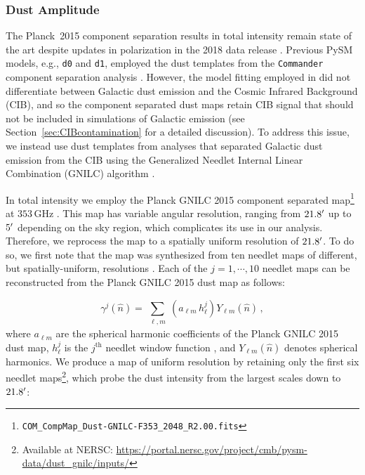 \documentclass[twocolumn]{aastex631}
\begin{document}
\subsubsection{Dust Amplitude}\label{sec:dustamplitude}
The Planck~2015 component separation results in total intensity remain state of the art despite updates in polarization in the 2018 data release \citep{planck2016-l04}. Previous PySM models, e.g., \texttt{d0} and \texttt{d1}, employed the dust templates from the \texttt{Commander} component separation analysis \citep{planck2014-a11}. However, the model fitting employed in \citet{planck2014-a11} did not differentiate between Galactic dust emission and the Cosmic Infrared Background (CIB), and so the component separated dust maps retain CIB signal that should not be included in simulations of Galactic emission (see Section~\ref{sec:CIBcontamination} for a detailed discussion). To address this issue, we instead use dust templates from analyses that separated Galactic dust emission from the CIB using the Generalized Needlet Internal Linear Combination (GNILC) algorithm \citep{Remazeilles:2011}. 

In total intensity we employ the Planck GNILC 2015 component separated map\footnote{\texttt{COM\_CompMap\_Dust-GNILC-F353\_2048\_R2.00.fits}} at $353$\,GHz \citep{planck2016-XLVIII}. This map has variable angular resolution, ranging from $21.8\mbox{$^\prime$}$ up to $5\mbox{$^\prime$}$ depending on the sky region, which complicates its use in our analysis. Therefore, we reprocess the map to a spatially uniform resolution of $21.8\mbox{$^\prime$}$. To do so, we first note that the map was synthesized from ten needlet maps of different, but spatially-uniform, resolutions \citep[][Figure~A.2]{planck2016-l04}. Each of the $j=1,\cdots,10$ needlet maps can be reconstructed from the Planck GNILC 2015 dust map as follows:

\begin{equation}
\gamma^{j}(\hat{n})
=\sum_{\substack{\ell,m}} \left(a_{\ell m}\, h^{j}_\ell\right)Y_{\ell m}(\hat{n})\,,
\label{eq:needlets_maps}
\end{equation}
where $a_{\ell m}$ are the spherical harmonic coefficients of the Planck GNILC 2015 dust map,  $h^{j}_\ell$ is the $j^\text{th}$ needlet window function \citep[see][Figure~A.2]{planck2016-l04}, and $Y_{\ell m}(\hat{n})$ denotes spherical harmonics. We produce a map of uniform resolution by retaining only the first six needlet maps\footnote{Available at NERSC: \url{https://portal.nersc.gov/project/cmb/pysm-data/dust_gnilc/inputs/}}, which probe the dust intensity from the largest scales down to $21.8\mbox{$^\prime$}$:
\end{document}
